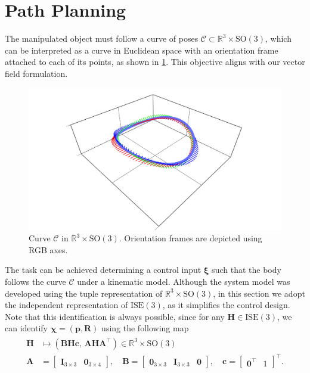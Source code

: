 \section{Path Planning}
The manipulated object must follow a curve of poses $\mathcal{C}\subset \mathbb{R}^3\times\text{SO}(3)$, which can be interpreted as a curve in Euclidean space with an orientation frame attached to each of its points, as shown in \cref{fig:curvewithframes}. This objective aligns with our vector field formulation.
\begin{figure}[ht]
    \centering
    \includegraphics[width=.8\linewidth]{figures/curve_with_frames.pdf}
    \caption{Curve $\mathcal{C}$ in $\mathbb{R}^3\times\text{SO}(3)$. Orientation frames are depicted using RGB axes.}
    \label{fig:curvewithframes}
\end{figure}

The task can be achieved determining a control input $\boldsymbol{\xi}$ such that the body follows the curve $\mathcal{C}$ under a kinematic model. Although the system model was developed using the tuple representation of $\mathbb{R}^3\times\text{SO}(3)$, in this section we adopt the independent representation of $\text{ISE}(3)$, as it simplifies the control design. Note that this identification is always possible, since for any $\mathbf{H}\in\text{ISE}(3)$, we can identify $\boldsymbol{\chi}=(\mathbf{p}, \mathbf{R})$ using the following map
\begin{align}
    \begin{split}
        \mathbf{H} &\mapsto (\mathbf{B}\mathbf{H}\mathbf{c},\, \mathbf{A}\mathbf{H}\mathbf{A}^\top) \in \mathbb{R}^3\times\text{SO}(3)\\
        \mathbf{A} &= \begin{bmatrix}
            \mathbf{I}_{3\times 3} & \mathbf{0}_{3\times 4}
        \end{bmatrix}, \quad
        \mathbf{B} = \begin{bmatrix}
            \mathbf{0}_{3\times 3} & \mathbf{I}_{3\times 3} & \mathbf{0}
        \end{bmatrix}, \quad
        \mathbf{c} = \begin{bmatrix}
            \mathbf{0}^\top & 1
        \end{bmatrix}^\top.
    \end{split}
\end{align}

